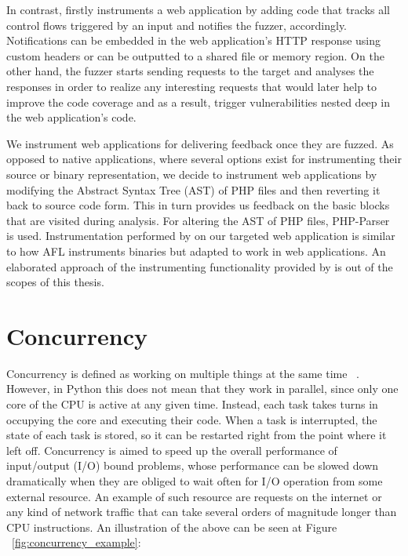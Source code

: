 In contrast, \pname firstly instruments a web application by adding code that tracks all control flows triggered by an input and notifies the fuzzer, accordingly. Notifications can be embedded in the web application's HTTP response using custom headers or can be outputted to a shared file or memory region. On the other hand, the fuzzer starts sending requests to the target and analyses the responses in order to realize any interesting requests that would later help to improve the code coverage and as a result, trigger vulnerabilities nested deep in the web application's code.

We instrument web applications for delivering feedback once
they are fuzzed. As opposed to native applications, where
several options exist for instrumenting their source or binary
representation, we decide to instrument web applications by
modifying the Abstract Syntax Tree (AST) of PHP files and then reverting it back to source code form. This in
turn provides us feedback on the basic blocks that are visited during analysis. For altering the AST of PHP files, PHP-Parser ~\cite{nikicPhpParser} is used. 
Instrumentation performed by \pname on our targeted web application is similar to how AFL instruments binaries but adapted to work in web applications. An elaborated approach of the instrumenting functionality provided by \pname is out of the scopes of this thesis.

\section{Concurrency}
Concurrency is defined as working on multiple things at the same time ~\cite{concurrency_realpython}. However, in Python this does not mean that they work in parallel, since only one core of the CPU is active at any given time. Instead, each task takes turns in occupying the core and executing their code. When a task is interrupted, the state of each task is stored, so it can be restarted right from the point where it left off. Concurrency is aimed to speed up the overall performance of input/output (I/O) bound problems, whose performance can be slowed down dramatically when they are obliged to wait often for I/O operation from some external resource. An example of such resource are requests on the internet or any kind of network traffic that can take several orders of magnitude longer than CPU instructions. An illustration of the above can be seen at Figure ~\ref{fig:concurrency_example}:

